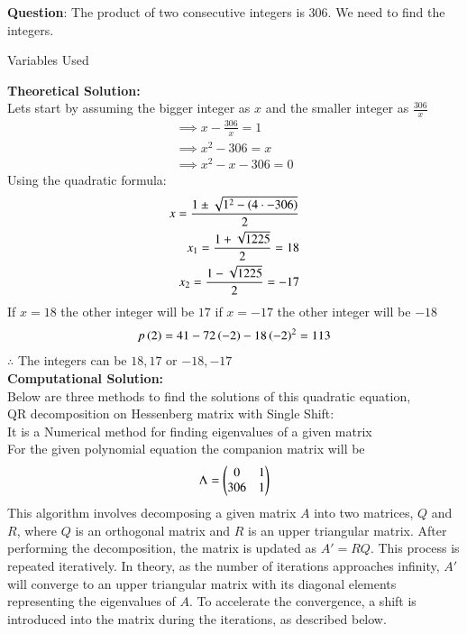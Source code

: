 \documentclass[journal]{IEEEtran}
\begin{document}
\textbf{Question}:\newline
The product of two consecutive integers is $306$. We need to find the integers.
\newline
\begin{table}[h!]    
  \centering
  
  \caption{Variables Used}
  \label{tab1.1.2.2}
\end{table}
\newline
\textbf{Theoretical Solution:}\\
Lets start by assuming the bigger integer as $x$ and the smaller integer as $\frac{306}{x}$
\begin{align}
    \implies x-\frac{306}{x}=1\\
    \implies x^2-306=x\\
    \implies x^2-x-306=0
\end{align}
Using the quadratic formula:
\begin{align}
    x=\frac{1\pm\sqrt{1^2-\left(4\cdot -306\right)}}{2}\\
    x_1=\frac{1+\sqrt{1225}}{2}=18\\
    x_2=\frac{1-\sqrt{1225}}{2}=-17
\end{align}
If $x=18$ the other integer will be $17$ if $x=-17$ the other integer will be $-18$
\begin{align}
    p\left(2\right)=41-72\left(-2\right)-18\left(-2\right)^2=113
\end{align}
$\therefore$ The integers can be $18,17$ or $-18,-17$\\
\textbf{Computational Solution:}\\
Below are three methods to find the solutions of this quadratic equation,\\
QR decomposition on Hessenberg matrix with Single Shift:\\
It is a Numerical method for finding eigenvalues of a given matrix\\
For the given polynomial equation the companion matrix will be
\begin{align}
	\Lambda = \begin{pmatrix}0 & 1\\306 & 1\end{pmatrix}
\end{align}
This algorithm involves decomposing a given matrix $A$ into two matrices, $Q$ and $R$, where $Q$ is an orthogonal matrix and $R$ is an upper triangular matrix. After performing the decomposition, the matrix is updated as $A' = RQ$. This process is repeated iteratively. In theory, as the number of iterations approaches infinity, $A'$ will converge to an upper triangular matrix with its diagonal elements representing the eigenvalues of $A$. To accelerate the convergence, a shift is introduced into the matrix during the iterations, as described below.
\end{document}
